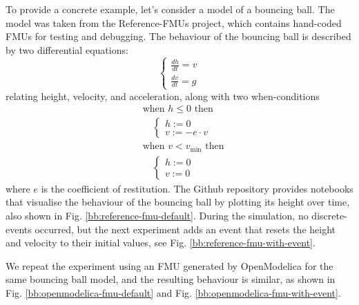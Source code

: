 \documentclass[conference]{IEEEtran}
\begin{document}
To provide a concrete example, let's consider a model of a bouncing ball.
The model was taken from the Reference-FMUs project, which contains hand-coded FMUs for testing and debugging.
The behaviour of the bouncing ball is described by two differential equations:
\[
\begin{cases}
\frac{dh}{dt} = v \\
\frac{dv}{dt} = g
\end{cases}
\]
relating height, velocity, and acceleration, along with two when-conditions
\[
\begin{aligned}
&\text{when } h \leq 0 \text{ then} \\
&\quad \begin{cases}
h := 0 \\
v := -e \cdot v
\end{cases} \\
&\text{when } v < v_{\text{min}} \text{ then} \\
&\quad \begin{cases}
h := 0 \\
v := 0
\end{cases}
\end{aligned}
\]
where $e$ is the coefficient of restitution.
The Github repository provides notebooks that visualise the behaviour of the bouncing ball by plotting its height over time, also shown in Fig. \ref{bb:reference-fmu-default}.
During the simulation, no discrete-events occurred, but the next experiment adds an event that resets the height and velocity to their initial values, see Fig. \ref{bb:reference-fmu-with-event}.

We repeat the experiment using an FMU generated by OpenModelica for the same bouncing ball model, and the resulting behaviour is similar, as shown in Fig. \ref{bb:openmodelica-fmu-default} and Fig. \ref{bb:openmodelica-fmu-with-event}.
\end{document}
